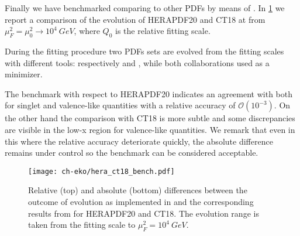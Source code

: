 Finally we have benchmarked \eko{} comparing to other PDFs by means of \lhapdf{}.
In \cref{fig:eko/Hera_ct18_bench} we report a comparison of the evolution of
HERAPDF20 and CT18 at \nnlo{} from $\mu_{F}^2=\mu_{0}^2 \rightarrow 10^4~GeV$, where
$Q_{0}$ is the relative fitting scale.

During the fitting procedure two PDFs sets are evolved from the fitting scales
with different tools: respectively \hoppet{} and \qcdnum{}, while both collaborations used
\xfitter{} as a minimizer.

The benchmark with respect to HERAPDF20 indicates an agreement with \eko{}
both for singlet and valence-like quantities with a relative accuracy of $\mathcal{O}(10^{-3})$.
On the other hand the comparison with CT18 is more subtle and some discrepancies are visible
in the low-x region for valence-like quantities. We remark that even in this where the relative accuracy
deteriorate quickly, the absolute difference remains under control so the benchmark can be considered
acceptable.


\begin{figure}
      \texttt{[image: ch-eko/hera\_ct18\_bench.pdf]}
      \caption{Relative (top)  and absolute (bottom) differences between
          the outcome of \nnlo{} \qcd{} evolution
          as implemented in \eko{} and the
          corresponding results from \lhapdf{} for HERAPDF20 and CT18.
          The evolution range is taken from the fitting scale to $\mu_{F}^2=10^4~GeV$.
          \label{fig:eko/Hera_ct18_bench} }
  \end{figure}

